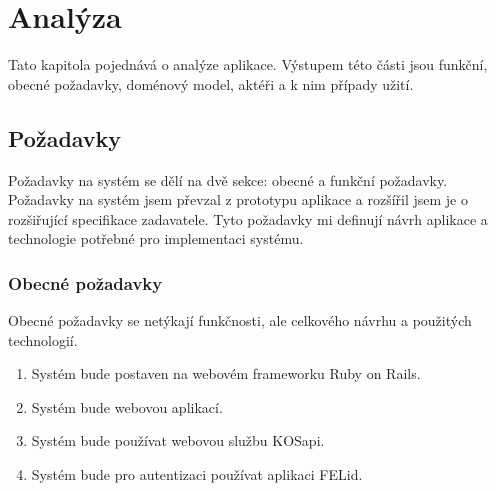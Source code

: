 \chapter{Analýza}
Tato kapitola pojednává o analýze aplikace. Výstupem této části jsou funkční, obecné požadavky, doménový model, aktéři a k nim případy užití.

\section{Požadavky}
Požadavky na systém se dělí na dvě sekce: obecné a funkční požadavky. Požadavky na systém jsem převzal z prototypu aplikace \citep{prototyp_documentace} a rozšířil jsem je o rozšiřující specifikace zadavatele. Tyto požadavky mi definují návrh aplikace a technologie potřebné pro implementaci systému.

\subsection{Obecné požadavky}
Obecné požadavky se netýkají funkčnosti, ale celkového návrhu a použitých technologií.
\begin{enumerate}
\item Systém bude postaven na webovém frameworku Ruby on Rails.
\item Systém bude webovou aplikací.
\item Systém bude používat webovou službu KOSapi.
\item Systém bude pro autentizaci používat aplikaci FELid.
\end{enumerate}

